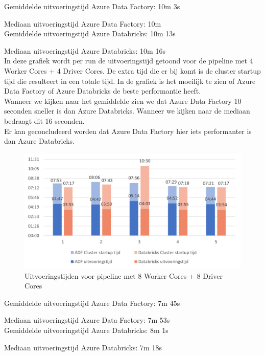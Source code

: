 Gemiddelde uitvoeringstijd Azure Data Factory: 10m 3s

Mediaan uitvoeringstijd Azure Data Factory: 10m\\

Gemiddelde uitvoeringstijd Azure Databricks: 10m 13s

Mediaan uitvoeringstijd Azure Databricks: 10m 16s\\

In deze grafiek wordt per run de uitvoeringstijd getoond voor de pipeline met 4 Worker Cores + 4 Driver Cores. De extra tijd die er bij komt is de cluster startup tijd die resulteert in een totale tijd. In de grafiek is het moeilijk te zien of Azure Data Factory of Azure Databricks de beste performantie heeft.\\

Wanneer we kijken naar het gemiddelde zien we dat Azure Data Factory 10 seconden sneller is dan Azure Databricks. Wanneer we kijken naar de mediaan bedraagt dit 16 seconden.\\

Er kan geconcludeerd worden dat Azure Data Factory hier iets performanter is dan Azure Databricks.

\begin{figure}[H]
    \centering
    \includegraphics[width=1\textwidth]{./graphics/kosten/graf4_update.png}
    \caption{Uitvoeringstijden voor pipeline met 8 Worker Cores + 8 Driver Cores}
\end{figure}

Gemiddelde uitvoeringstijd Azure Data Factory: 7m 45s

Mediaan uitvoeringstijd Azure Data Factory: 7m 53s\\

Gemiddelde uitvoeringstijd Azure Databricks: 8m 1s

Mediaan uitvoeringstijd Azure Databricks: 7m 18s\\

